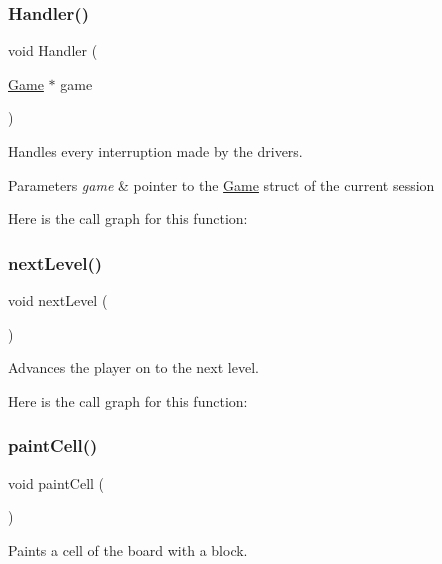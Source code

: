 \subsubsection{\texorpdfstring{Handler()}{Handler()}}
{\footnotesize\ttfamily void Handler (\begin{DoxyParamCaption}\item[{\mbox{\hyperlink{struct_game}{Game}} $\ast$}]{game }\end{DoxyParamCaption})}



Handles every interruption made by the drivers. 


\begin{DoxyParams}{Parameters}
{\em game} & pointer to the \mbox{\hyperlink{struct_game}{Game}} struct of the current session \\
\hline
\end{DoxyParams}
Here is the call graph for this function\+:
\mbox{\label{group__game_gac165fe517b083b5ccd861bf028a67b7e}} 
\subsubsection{\texorpdfstring{nextLevel()}{nextLevel()}}
{\footnotesize\ttfamily void next\+Level (\begin{DoxyParamCaption}{ }\end{DoxyParamCaption})}



Advances the player on to the next level. 

Here is the call graph for this function\+:
\mbox{\label{group__game_gac9ffb5de47cf14e382f2f7c0f359eb39}} 
\subsubsection{\texorpdfstring{paintCell()}{paintCell()}}
{\footnotesize\ttfamily void paint\+Cell (\begin{DoxyParamCaption}{ }\end{DoxyParamCaption})}



Paints a cell of the board with a block. 

\mbox{\label{group__game_gad54324212d792e38302b19e409a413ae}} 
